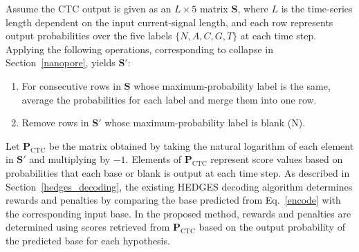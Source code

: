 \documentclass[sotsuron]{kuee}
\begin{document}
Assume the CTC output is given as an $L\times 5$ matrix $\bm{S}$, where $L$ is
the time-series length dependent on the input current-signal length, and each
row represents output probabilities over the five labels $\{N,A,C,G,T\}$ at
each time step.
Applying the following operations, corresponding to collapse in
Section~\ref{nanopore}, yields $\bm{S}'$:
\begin{enumerate}
  \item For consecutive rows in $\bm{S}$ whose maximum-probability label is the
  same, average the probabilities for each label and merge them into one row.
  \item Remove rows in $\bm{S}'$ whose maximum-probability label is blank (N).
\end{enumerate}
Let $\bm{P}_{\mathrm{CTC}}$ be the matrix obtained by taking the natural
logarithm of each element in $\bm{S}'$ and multiplying by $-1$.
Elements of $\bm{P}_{\mathrm{CTC}}$ represent score values based on
probabilities that each base or blank is output at each time step.
As described in Section~\ref{hedges_decoding}, the existing HEDGES decoding
algorithm determines rewards and penalties by comparing the base predicted from
Eq.~\eqref{encode} with the corresponding input base.
In the proposed method, rewards and penalties are determined using scores
retrieved from $\bm{P}_{\mathrm{CTC}}$ based on the output probability of the
predicted base for each hypothesis.
\end{document}
